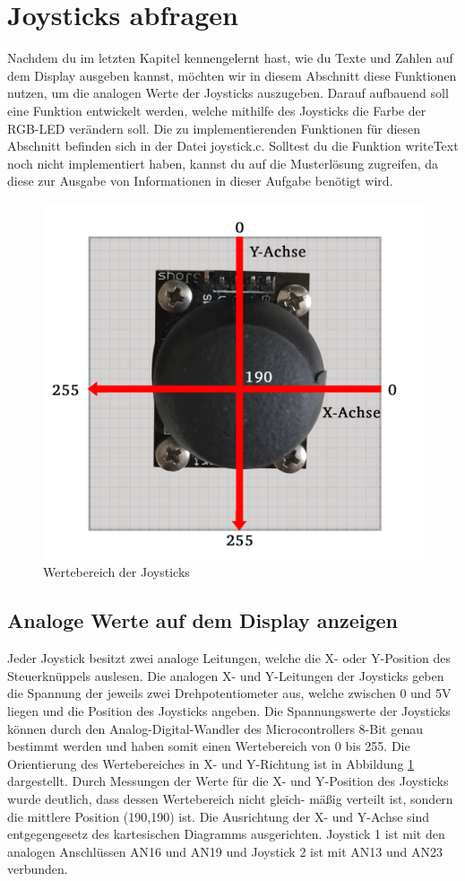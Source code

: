 \section{\ExercisePrefixEmbeddedC Joysticks abfragen \optional}
Nachdem du im letzten Kapitel kennengelernt hast, wie du Texte und Zahlen auf dem Display ausgeben kannst, möchten wir in diesem Abschnitt diese Funktionen nutzen, um die analogen Werte der Joysticks auszugeben. Darauf aufbauend soll eine Funktion entwickelt werden, welche mithilfe des Joysticks die Farbe der RGB-LED verändern soll. Die zu implementierenden Funktionen für diesen Abschnitt befinden sich in der Datei joystick.c. Solltest du die Funktion writeText noch nicht implementiert haben, kannst du auf die Musterlösung zugreifen, da diese zur Ausgabe von Informationen in dieser Aufgabe benötigt wird. 
\begin{figure}
	\begin{centering}
		\includegraphics[width=.4\textwidth]{./05_c/figures/joystickValues.png}
		\caption{Wertebereich der Joysticks}
		\label{fig:jostickValues}
	\end{centering}
\end{figure}
\subsection{Analoge Werte auf dem Display anzeigen}

Jeder Joystick besitzt zwei analoge Leitungen, welche die X- oder Y-Position des Steuerknüppels auslesen. Die analogen X- und Y-Leitungen der Joysticks geben die Spannung der jeweils zwei Drehpotentiometer aus, welche zwischen 0 und 5V liegen und die Position des Joysticks angeben. Die Spannungswerte der Joysticks können durch den Analog-Digital-Wandler des Microcontrollers 8-Bit genau bestimmt werden und haben somit einen Wertebereich von 0 bis 255. Die Orientierung des Wertebereiches in X- und Y-Richtung ist in Abbildung \ref{fig:jostickValues} dargestellt. Durch Messungen der Werte für die X- und Y-Position des Joysticks wurde deutlich, dass dessen Wertebereich nicht gleich- mäßig verteilt ist, sondern die mittlere Position (190,190) ist. Die Ausrichtung der X- und Y-Achse sind entgegengesetz des kartesischen Diagramms ausgerichten. Joystick 1 ist mit den analogen Anschlüssen AN16 und AN19 und Joystick 2 ist mit AN13 und AN23 verbunden. 

